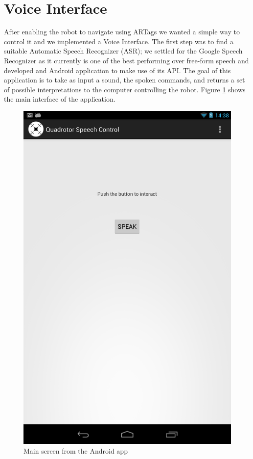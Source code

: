 \section{Voice Interface}

After enabling the robot to navigate using ARTags we wanted a simple way to control it and we implemented a Voice Interface. The first step was to find a suitable Automatic Speech Recognizer (ASR); we settled for the Google Speech Recognizer as it currently is one of the best performing over free-form speech and developed and Android application to make use of its API. The goal of this application is to take as input a sound, the spoken commands, and returns a set of possible interpretations to the computer controlling the robot. Figure \ref{fig:tablet_speak} shows the main interface of the application. 

\begin{figure}[h!]
  \centering
    \includegraphics[scale=0.25]{figs/tablet1.png}
  \caption{Main screen from the Android app}
  \label{fig:tablet_speak}
\end{figure}


